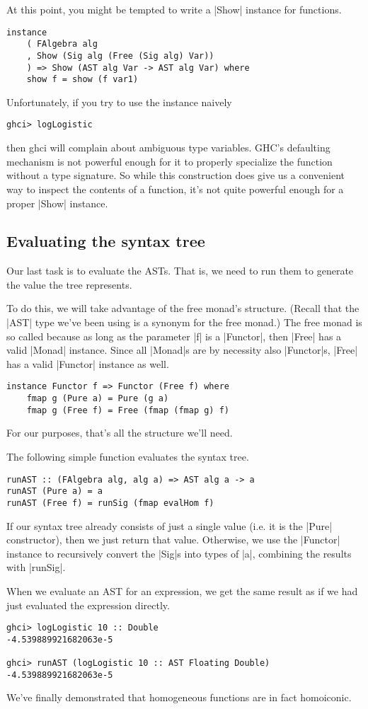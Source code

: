 \documentclass[preprint]{sigplanconf}
\theoremstyle{definition}
\begin{document}
At this point, you might be tempted to write a |Show| instance for functions.
\begin{lstlisting}
instance
    ( FAlgebra alg
    , Show (Sig alg (Free (Sig alg) Var))
    ) => Show (AST alg Var -> AST alg Var) where
    show f = show (f var1)
\end{lstlisting}
Unfortunately, if you try to use the instance naively
\begin{lstlisting}
ghci> logLogistic
\end{lstlisting}
then ghci will complain about ambiguous type variables.
GHC's defaulting mechanism is not powerful enough for it to properly specialize the function without a type signature.
So while this construction does give us a convenient way to inspect the contents of a function,
it's not quite powerful enough for a proper |Show| instance.

\subsection{Evaluating the syntax tree}
Our last task is to evaluate the ASTs.
That is, we need to run them to generate the value the tree represents.

To do this, we will take advantage of the free monad's structure.
(Recall that the |AST| type we've been using is a synonym for the free monad.)
The free monad is so called because as long as the parameter |f| is a |Functor|,
then |Free| has a valid |Monad| instance.
Since all |Monad|s are by necessity also |Functor|s,
|Free| has a valid |Functor| instance as well.
\begin{lstlisting}
instance Functor f => Functor (Free f) where
    fmap g (Pure a) = Pure (g a)
    fmap g (Free f) = Free (fmap (fmap g) f)
\end{lstlisting}
For our purposes, that's all the structure we'll need.

The following simple function evaluates the syntax tree.
\begin{lstlisting}
runAST :: (FAlgebra alg, alg a) => AST alg a -> a
runAST (Pure a) = a
runAST (Free f) = runSig (fmap evalHom f)
\end{lstlisting}
If our syntax tree already consists of just a single value (i.e. it is the |Pure| constructor),
then we just return that value.
Otherwise, we use the |Functor| instance to recursively convert the |Sig|s into types of |a|,
combining the results with |runSig|.

When we evaluate an AST for an expression,
we get the same result as if we had just evaluated the expression directly.
\begin{lstlisting}
ghci> logLogistic 10 :: Double
-4.539889921682063e-5

ghci> runAST (logLogistic 10 :: AST Floating Double)
-4.539889921682063e-5
\end{lstlisting}
We've finally demonstrated that homogeneous functions are in fact homoiconic.
\end{document}
